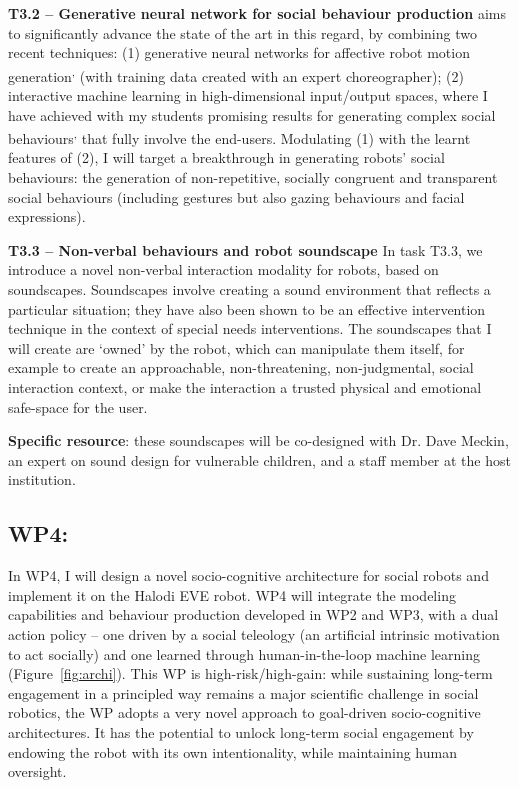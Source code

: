\textbf{T3.2 -- Generative neural network for social behaviour production}
\project aims to significantly advance the state of the art in this regard, by
combining two recent techniques: (1) generative neural networks for affective
robot motion
generation\textsuperscript{,}
(with training data created with an expert choreographer); (2) interactive
machine learning in high-dimensional input/output spaces, where I have achieved
with my students promising results for generating complex social
behaviours\textsuperscript{,}
that fully involve the end-users. Modulating (1)
with the learnt features of (2), I will target a breakthrough in generating robots' social
behaviours: the generation of non-repetitive, socially congruent and
transparent social behaviours (including gestures but also gazing behaviours and
facial expressions).

\textbf{T3.3 -- Non-verbal behaviours and robot soundscape} In task T3.3, we
introduce a novel non-verbal interaction modality for robots, based on
soundscapes. Soundscapes involve creating a sound environment that reflects a
particular situation; they have also been shown to be an effective intervention
technique in the context of special needs
interventions. The soundscapes that I will
create are `owned' by the robot, which can manipulate them itself, for example
to create an approachable, non-threatening, non-judgmental, social interaction
context, or make the interaction a trusted physical and emotional safe-space for
the user.

\textbf{Specific resource}: these soundscapes will be co-designed with Dr.
Dave Meckin, an expert on sound design for vulnerable children, and a staff
member at the host institution.

\subsection{WP4: \textbf{\wpFour}}

In WP4, I will design a novel socio-cognitive architecture for social
robots and implement it on the Halodi EVE robot. WP4 will integrate the
modeling capabilities and behaviour production developed in WP2 and WP3, with a
dual action policy -- one driven by a social teleology (an artificial
intrinsic motivation to act socially) and one learned through
human-in-the-loop machine learning (Figure~\ref{fig:archi}). This WP is high-risk/high-gain: while sustaining
long-term engagement in a principled way remains a major scientific
challenge in social robotics, the WP adopts a very novel
approach to goal-driven socio-cognitive architectures. It has the potential to
unlock long-term social engagement by endowing the robot with its own
intentionality, while maintaining human oversight.

